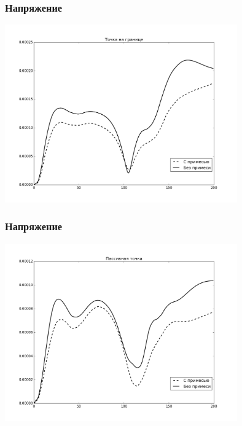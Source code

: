 \documentclass[14pt]{beamer}
\begin{document}
\begin{frame}
\frametitle{Напряжение}
    \begin{center}
        \includegraphics[width=10cm]{forces_boundary_point.png}
    \end{center}
\end{frame}

\begin{frame}
\frametitle{Напряжение}
    \begin{center}
        \includegraphics[width=10cm]{forces_passive_point.png}
    \end{center}
\end{frame}
\end{document}
